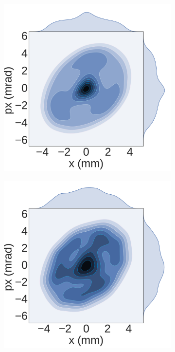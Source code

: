 \begin{figure}[!htb]
    \centering
    \begin{subfigure}[b]{0.48\textwidth}
        \includegraphics[width=\textwidth]{plot/particle_contour_nlevel9/sptc00002_xpx.pdf}
        \caption{}
    \end{subfigure}
    \begin{subfigure}[b]{0.48\textwidth}
        \includegraphics[width=\textwidth]{plot/particle_contour_nlevel9/sptc00005_xpx.pdf}

\end{subfigure}
\end{figure}
